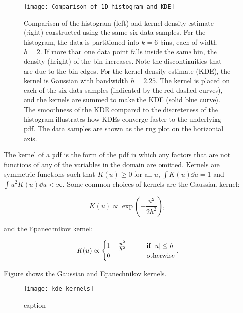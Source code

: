 \begin{figure}[htb]
    \centering
    \texttt{[image: Comparison\_of\_1D\_histogram\_and\_KDE]}
    \caption{Comparison of the histogram (left) and kernel density estimate (right) constructed using the same six data samples. For the histogram, the data is partitioned into $k=6$ bins, each of width $h=2$. If more than one data point falls inside the same bin, the density (height) of the bin increases. Note the discontinuities that are due to the bin edges. For the kernel density estimate (KDE), the kernel is Gaussian with bandwidth $h=2.25$. The kernel is placed on each of the six data samples (indicated by the red dashed curves), and the kernels are summed to make the KDE (solid blue curve). The smoothness of the KDE compared to the discreteness of the histogram illustrates how KDEs converge faster to the underlying pdf. The data samples are shown as the rug plot on the horizontal axis.
    }
    \label{fig:kde_figure}
\end{figure}


The kernel of a pdf is the form of the pdf in which any factors that are not functions of any of the variables in the domain are omitted. Kernels are symmetric functions such that $K(u) \geq 0$ for all $u$, $\int K(u) \dd{u}=1$ and $\int u^2 K(u) \dd{u} < \infty$. Some common choices of kernels are the Gaussian kernel:

\begin{equation}\label{eq:gaussian_kernel}
    K(u) \propto \exp(- \frac{u^2}{2h^2}),
\end{equation}

and the Epanechnikov kernel:

\begin{equation}\label{eq:epkov_kernel}
    K (u) \propto \begin{cases} 
    1 - \frac{u^2}{h^2} \qquad &\text{if } \abs{u} \leq h 
    \\
    0 \qquad &\text{otherwise}
    \end{cases}.
\end{equation}

Figure shows the Gaussian and Epanechnikov kernels. 

\begin{figure}[htb]
    \centering
    \texttt{[image: kde\_kernels]}
    \caption{caption
    }
    \label{fig:kde_kernels}
\end{figure}

